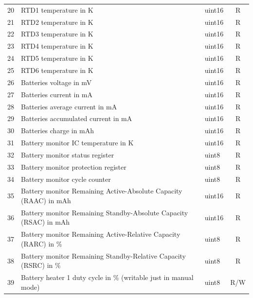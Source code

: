 \begin{longtable}[c]{cL{0.72\textwidth}lc}
    20  & RTD1 temperature in K                                             & uint16 & R \\
    21  & RTD2 temperature in K                                             & uint16 & R \\
    22  & RTD3 temperature in K                                             & uint16 & R \\
    23  & RTD4 temperature in K                                             & uint16 & R \\
    24  & RTD5 temperature in K                                             & uint16 & R \\
    25  & RTD6 temperature in K                                             & uint16 & R \\
    26  & Batteries voltage in mV                                           & uint16 & R \\
    27  & Batteries current in mA                                           & uint16 & R \\
    28  & Batteries average current in mA                                   & uint16 & R \\
    29  & Batteries accumulated current in mA                               & uint16 & R \\
    30  & Batteries charge in mAh                                           & uint16 & R \\
    31  & Battery monitor IC temperature in K                               & uint16 & R \\
    32  & Battery monitor status register                                   & uint8  & R \\
    33  & Battery monitor protection register                               & uint8  & R \\
    34  & Battery monitor cycle counter                                     & uint8  & R \\
    35  & Battery monitor Remaining Active-Absolute Capacity (RAAC) in mAh  & uint16 & R \\
    36  & Battery monitor Remaining Standby-Absolute Capacity (RSAC) in mAh & uint16 & R \\
    37  & Battery monitor Remaining Active-Relative Capacity (RARC) in \%   & uint8  & R \\
    38  & Battery monitor Remaining Standby-Relative Capacity (RSRC) in \%  & uint8  & R \\
    39  & Battery heater 1 duty cycle in \% (writable just in manual mode)  & uint8  & R/W \\

\end{longtable}
